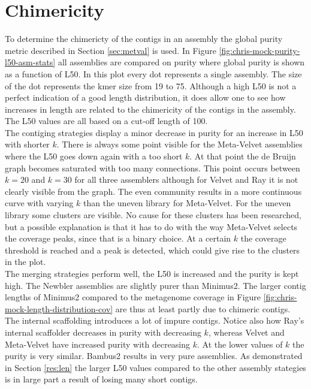\documentclass[a4paper,12pt]{report}
\begin{document}
\section{Chimericity}
\label{sec:reschi}
To determine the chimericty of the contigs in an assembly the global purity
metric described in Section \ref{sec:metval} is used. In Figure \ref{fig:chris-mock-purity-l50-asm-stats} 
all assemblies are compared on purity where global purity is shown as a
function of L50. In this plot every dot represents a single assembly. The size
of the dot represents the kmer size from 19 to 75. Although a high L50 is not a
perfect indication of a good length distribution, it does allow one to see how
increases in length are related to the chimericity of the contigs in the
assembly. The L50 values are all based on a cut-off length of 100.\\


The contiging strategies display a minor decrease in purity for an increase in
L50 with shorter $k$. There is always some point visible for the Meta-Velvet
assemblies where the L50 goes down again with a too short $k$. At that point
the de Bruijn graph becomes saturated with too many connections. This point
occurs between $k=20$ and $k=30$ for all three assemblers although for Velvet
and Ray it is not clearly visible from the graph. The even community results in
a more continuous curve with varying $k$ than the uneven library for
Meta-Velvet. For the uneven library some clusters are visible. No cause for
these clusters has been researched, but a possible explanation is that it has
to do with the way Meta-Velvet selects the coverage peaks, since that is a
binary choice. At a certain $k$ the coverage threshold is reached and a peak is
detected, which could give rise to the clusters in the plot.\\


The merging strategies perform well, the L50 is increased and the purity is
kept high. The Newbler assemblies are slightly purer than Minimus2. The larger
contig lengths of Minimus2 compared to the metagenome coverage in Figure
\ref{fig:chris-mock-length-distribution-cov} are thus at least partly due to
chimeric contigs.\\


The internal scaffolding introduces a lot of impure contigs. Notice also how
Ray's internal scaffolder decreases in purity with decreasing $k$, whereas
Velvet and Meta-Velvet have increased purity with decreasing $k$. At the lower
values of $k$ the purity is very similar. Bambus2 results in very pure
assemblies. As demonstrated in Section \ref{res:len} the larger L50 values
compared to the other assembly stategies is in large part a result of losing
many short contigs.\\
\end{document}
